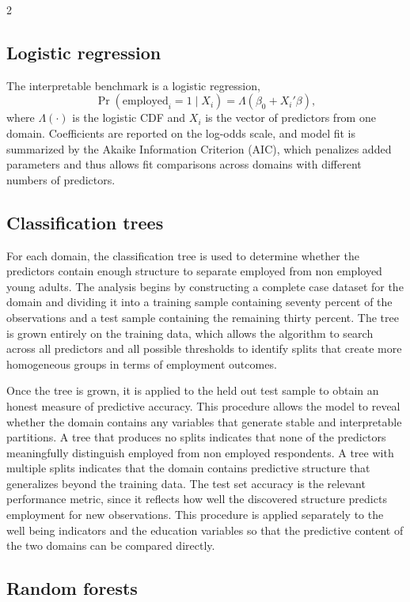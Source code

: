 \documentclass[
  11pt,
]{article}
\begin{document}
\begin{multicols}{2}
\subsection{Logistic regression}
The interpretable benchmark is a logistic regression,
\begin{equation}
\Pr(\text{employed}_i = 1 \mid X_i) = \Lambda\!\left(\beta_0 + X_i'\beta\right),
\end{equation}
where $\Lambda(\cdot)$ is the logistic CDF and $X_i$ is the vector of predictors from one domain. Coefficients are reported on the log-odds scale, and model fit is summarized by the Akaike Information Criterion (AIC), which penalizes added parameters and thus allows fit comparisons across domains with different numbers of predictors.

\subsection{Classification trees}
For each domain, the classification tree is used to determine whether the predictors contain enough structure to separate employed from non employed young adults. The analysis begins by constructing a complete case dataset for the domain and dividing it into a training sample containing seventy percent of the observations and a test sample containing the remaining thirty percent. The tree is grown entirely on the training data, which allows the algorithm to search across all predictors and all possible thresholds to identify splits that create more homogeneous groups in terms of employment outcomes. 

Once the tree is grown, it is applied to the held out test sample to obtain an honest measure of predictive accuracy. This procedure allows the model to reveal whether the domain contains any variables that generate stable and interpretable partitions. A tree that produces no splits indicates that none of the predictors meaningfully distinguish employed from non employed respondents. A tree with multiple splits indicates that the domain contains predictive structure that generalizes beyond the training data. The test set accuracy is the relevant performance metric, since it reflects how well the discovered structure predicts employment for new observations. This procedure is applied separately to the well being indicators and the education variables so that the predictive content of the two domains can be compared directly.


\subsection{Random forests}


\end{multicols}
\end{document}
